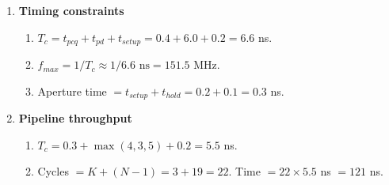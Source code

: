 \documentclass[11pt]{article}
\begin{document}
\begin{enumerate}[label=\textbf{B\arabic*.}]
  \item \textbf{Timing constraints}\\
  \begin{enumerate}[label=(\alph*)]
    \item $T_c = t_{pcq} + t_{pd} + t_{setup} = 0.4 + 6.0 + 0.2 = 6.6$ ns.
    \item $f_{max} = 1/T_c \approx 1/6.6\text{ ns} = 151.5$ MHz.
    \item Aperture time $= t_{setup}+t_{hold} = 0.2 + 0.1 = 0.3$ ns.
  \end{enumerate}

  \item \textbf{Pipeline throughput}\\
  \begin{enumerate}[label=(\alph*)]
    \item $T_c = 0.3 + \max(4,3,5) + 0.2 = 5.5$ ns.
    \item Cycles $= K + (N-1) = 3 + 19 = 22$. Time $= 22 \times 5.5$ ns $= 121$ ns.
  \end{enumerate}
\end{enumerate}
\end{document}
